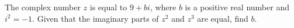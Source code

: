 The complex number $z$ is equal to $9+bi$, where $b$ is a positive real number and $i^{2}=-1$.  Given that the imaginary parts of $z^{2}$ and $z^{3}$ are equal, find $b$.